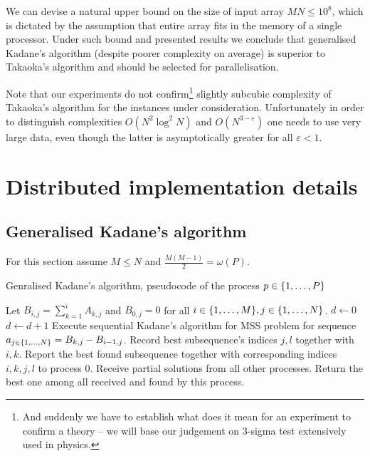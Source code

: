 We can devise a natural upper bound on the size of input array $MN \leq 10^8$, which is dictated by the assumption that entire array fits in the memory of a single processor.
Under such bound and presented results we conclude that generalised Kadane's algorithm (despite poorer complexity on average) is superior to Takaoka's algorithm and should be selected for parallelisation.

Note that our experiments do not confirm\footnote{And suddenly we have to establish what does it mean for an experiment to confirm a theory -- we will base our judgement on $3$-sigma test extensively used in physics.} slightly subcubic complexity of Takaoka's algorithm for the instances under consideration.
Unfortunately in order to distinguish complexities $O(N^2 \log^2{N})$ and $O(N^{3 - \varepsilon})$ one needs to use very large data, even though the latter is asymptotically greater for all $\varepsilon < 1$. 

\section*{Distributed implementation details}

\subsection*{Generalised Kadane's algorithm}

For this section assume $M \leq N$ and $\frac{M (M - 1)}{2} = \omega(P)$.

\begin{algorithm}[h!]
    \caption{Genralised Kadane's algorithm, pseudocode of the process $p \in \{ 1, \dots, P \}$}
    \begin{algorithmic}[1]
        \State Let $B_{i, j} = \sum_{k = 1}^{i}{A_{k, j}}$ and $B_{0, j} = 0$ for all $i \in \{ 1, \dots, M \}, j \in \{ 1, \dots, N \}$. \label{alg1-column-prefixes}
        \State $d \gets 0$
                \State $d \gets d + 1$
                    \State Execute sequential Kadane's algorithm for MSS problem for sequence $a_{j \in \{ 1, \dots, N \}} = B_{k, j} - B_{i-1, j}$.
                    \State Record best subsequence's indices $j, l$ together with $i, k$.
                \EndIf
            \EndFor
        \EndFor
            \State Report the best found subsequence together with corresponding indices $i, k, j, l$ to process $0$.
        \Else
            \State Receive partial solutions from all other processes.
            \State Return the best one among all received and found by this process.
        \EndIf
    \end{algorithmic}
\end{algorithm}

